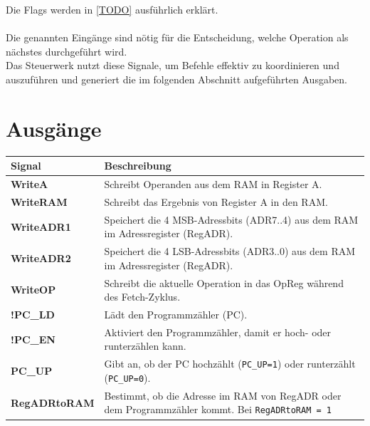 \noindent Die Flags werden in \autoref{TODO} ausführlich erklärt.
\\\\
Die genannten Eingänge sind nötig für die Entscheidung, welche Operation als nächstes durchgeführt wird. \\
Das Steuerwerk nutzt diese Signale, um Befehle effektiv zu koordinieren und auszuführen und generiert die im folgenden Abschnitt aufgeführten Ausgaben.

\section{Ausgänge}
\begin{table}[H]
    \centering
    \begin{tabular}{|l|p{10cm}|}
        \hline
        \textbf{Signal}      & \textbf{Beschreibung}                                                                                           \\ \hline
        \textbf{WriteA}      & Schreibt Operanden aus dem RAM in Register A.                                                                   \\ \hline
        \textbf{WriteRAM}    & Schreibt das Ergebnis von Register A in den RAM.                                                                \\ \hline
        \textbf{WriteADR1}   & Speichert die 4 MSB-Adressbits (ADR7..4) aus dem RAM im Adressregister (RegADR).                                \\ \hline
        \textbf{WriteADR2}   & Speichert die 4 LSB-Adressbits (ADR3..0) aus dem RAM im Adressregister (RegADR).                                \\ \hline
        \textbf{WriteOP}     & Schreibt die aktuelle Operation in das OpReg während des Fetch-Zyklus.                                          \\ \hline
        \textbf{!PC\_LD}     & Lädt den Programmzähler (PC).                                                                                   \\ \hline
        \textbf{!PC\_EN}     & Aktiviert den Programmzähler, damit er hoch- oder runterzählen kann.                                            \\ \hline
        \textbf{PC\_UP}      & Gibt an, ob der PC hochzählt (\texttt{PC\_UP=1}) oder runterzählt (\texttt{PC\_UP=0}).                          \\ \hline
        \textbf{RegADRtoRAM} & Bestimmt, ob die Adresse im RAM von RegADR oder dem Programmzähler kommt. Bei \texttt{RegADRtoRAM = 1}

\end{tabular}
\end{table}
